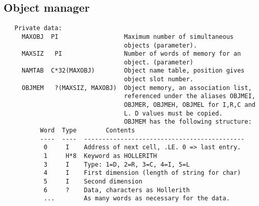 \subsection{Object manager}
{\small\begin{verbatim}
   Private data:
     MAXOBJ  PI                  Maximum number of simultaneous
                                 objects (parameter).
     MAXSIZ   PI                 Number of words of memory for an
                                 object. (parameter)
     NAMTAB  C*32(MAXOBJ)        Object name table, position gives
                                 object slot number.
     OBJMEM   ?(MAXSIZ, MAXOBJ)  Object memory, an association list,
                                 referenced under the aliases OBJMEI,
                                 OBJMER, OBJMEH, OBJMEL for I,R,C and
                                 L. D values must be copied.
                                 OBJMEM has the following structure:
          Word  Type        Contents
          ----  ----  --------------------------------------------
           0     I    Address of next cell, .LE. 0 => last entry.
           1     H*8  Keyword as HOLLERITH
           3     I    Type: 1=D, 2=R, 3=C, 4=I, 5=L
           4     I    First dimension (length of string for char)
           5     I    Second dimension
           6     ?    Data, characters as Hollerith
           ...        As many words as necessary for the data.


\end{verbatim}}
